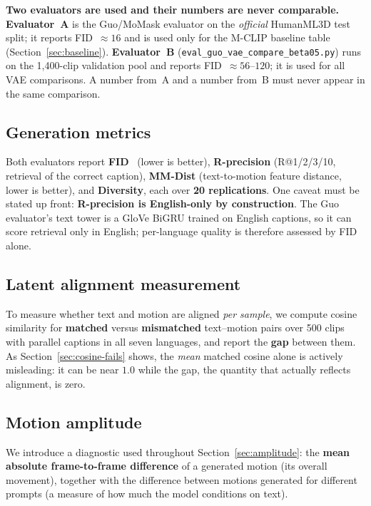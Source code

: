 \documentclass[11pt,a4paper]{report}
\newcommand{\callout}[1]{\begin{calloutenv}\small #1\end{calloutenv}}
\begin{document}
\callout{\textbf{Two evaluators are used and their numbers are never
comparable.} \textbf{Evaluator~A} is the Guo/MoMask evaluator on the
\emph{official} HumanML3D test split; it reports FID~$\approx 16$ and is
used only for the M-CLIP baseline table (Section~\ref{sec:baseline}).
\textbf{Evaluator~B} (\texttt{eval\_guo\_vae\_compare\_beta05.py}) runs on
the 1{,}400-clip validation pool and reports FID~$\approx 56$--$120$; it is
used for all VAE comparisons. A number from~A and a number from~B must
never appear in the same comparison.}

\subsection{Generation metrics}
Both evaluators report \textbf{FID}~\cite{heusel2017fid} (lower is better),
\textbf{R-precision} (R@1/2/3/10, retrieval of the correct caption),
\textbf{MM-Dist} (text-to-motion feature distance, lower is better), and
\textbf{Diversity}, each over \textbf{20 replications}. One caveat must be
stated up front: \textbf{R-precision is English-only by construction}. The
Guo evaluator's text tower is a GloVe BiGRU trained on English captions, so
it can score retrieval only in English; per-language quality is therefore
assessed by FID alone.

\subsection{Latent alignment measurement}
\label{sec:align-metric}
To measure whether text and motion are aligned \emph{per sample}, we
compute cosine similarity for \textbf{matched} versus \textbf{mismatched}
text--motion pairs over 500 clips with parallel captions in all seven
languages, and report the \textbf{gap} between them. As
Section~\ref{sec:cosine-fails} shows, the \emph{mean} matched cosine alone
is actively misleading: it can be near $1.0$ while the gap, the quantity
that actually reflects alignment, is zero.

\subsection{Motion amplitude}
We introduce a diagnostic used throughout Section~\ref{sec:amplitude}: the
\textbf{mean absolute frame-to-frame difference} of a generated motion (its
overall movement), together with the difference between motions generated
for different prompts (a measure of how much the model conditions on text).
\end{document}
